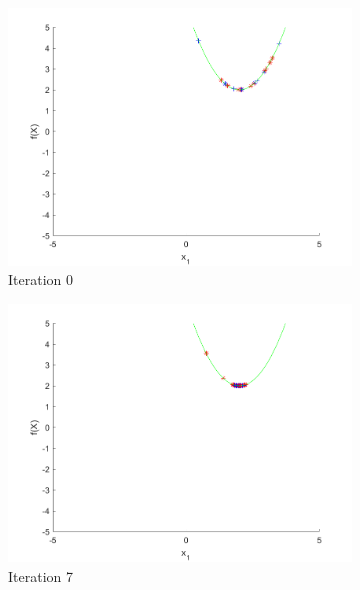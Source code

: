 \begin{figure}
 \begin{subfigure}[b]{0.4\textwidth}
   \includegraphics[width=\textwidth]{img/smpl/circshft/loa-iter-0}
   \caption{Iteration 0}
   \label{fig:s3-iter-0}
 \end{subfigure}
 \begin{subfigure}[b]{0.4\textwidth}
   \includegraphics[width=\textwidth]{img/smpl/circshft/loa-iter-7}
   \caption{Iteration 7}
   \label{fig:s3-iter-1}
 \end{subfigure}
 \begin{subfigure}[b]{0.4\textwidth}

\end{subfigure}
\end{figure}
